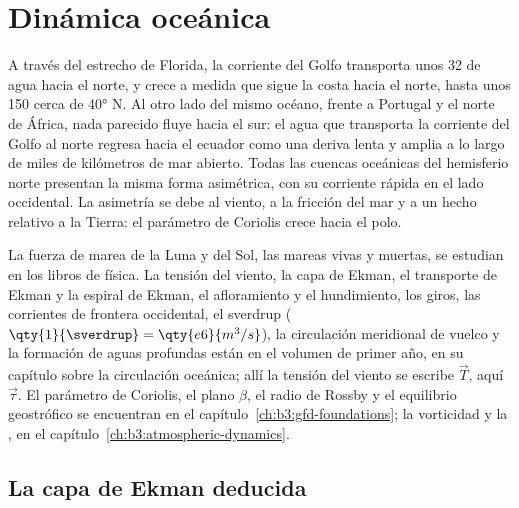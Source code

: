 \chapter{Dinámica oceánica}\label{ch:b3:ocean-dynamics}

A través del estrecho de Florida, la corriente del Golfo transporta unos
\qty{32}{\sverdrup} de agua hacia el norte, y crece a medida que sigue la costa
hacia el norte, hasta unos \qty{150}{\sverdrup} cerca de \ang{40} N. Al otro lado del mismo océano, frente a Portugal y el norte
de África, nada parecido fluye hacia el sur: el agua que transporta la corriente del Golfo
al norte regresa hacia el ecuador como una deriva lenta y amplia a lo largo de miles
de kilómetros de mar abierto. Todas las cuencas oceánicas del hemisferio norte presentan
la misma forma asimétrica, con su corriente rápida en el lado occidental. La
asimetría se debe al viento, a la fricción del mar y a un
hecho relativo a la Tierra: el parámetro de Coriolis crece hacia el polo.

\begin{recall}
La fuerza de marea de la Luna y del Sol, las mareas vivas y muertas, se estudian en los
libros de física. La tensión del viento, la capa de Ekman, el transporte de Ekman y
la espiral de Ekman, el afloramiento y el hundimiento, los giros, las corrientes
de frontera occidental, el sverdrup ($\qty{1}{\sverdrup} =
\qty{e6}{m^3/s}$), la circulación meridional de vuelco y la
formación de aguas profundas están en el volumen de primer año, en su capítulo sobre la
circulación oceánica; allí la tensión del viento se escribe $\vec T$, aquí
$\vec\tau$. El parámetro de Coriolis, el plano $\beta$, el radio de Rossby
y el equilibrio geostrófico se encuentran en el capítulo~\ref{ch:b3:gfd-foundations};
la vorticidad y la , en el capítulo~\ref{ch:b3:atmospheric-dynamics}.
\end{recall}

\section{La capa de Ekman deducida}\label{sec:b3:ocean-dynamics:ekman}

